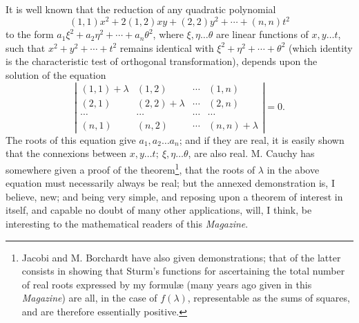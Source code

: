 \documentclass[11pt]{article}
\newcommand{\sourcepage}[1]{\marginpar{\scriptsize p.~#1}}
\begin{document}
{{\sourcepage{378}
It is well known that the reduction of any quadratic polynomial
\[
(1,1)x^2+2(1,2)xy+(2,2)y^2+\cdots+(n,n)t^2
\]
to the form $a_1\xi^2+a_2\eta^2+\cdots+a_n\theta^2$, where $\xi,\eta\ldots\theta$ are linear functions of $x,y\ldots t$, such that $x^2+y^2+\cdots+t^2$ remains identical with $\xi^2+\eta^2+\cdots+\theta^2$ (which identity is the characteristic test of orthogonal transformation), depends upon the solution of the equation
\[
\left|\begin{array}{cccc}
(1,1)+\lambda&(1,2)&\cdots&(1,n)\\
(2,1)&(2,2)+\lambda&\cdots&(2,n)\\
\cdots&\cdots&\cdots&\cdots\\
(n,1)&(n,2)&\cdots&(n,n)+\lambda
\end{array}\right|=0.
\]
The roots of this equation give $a_1,a_2\ldots a_n$; and if they are real, it is easily shown that the connexions between $x,y\ldots t;\ \xi,\eta\ldots\theta$, are also real. M. Cauchy has somewhere given a proof of the theorem\footnote{Jacobi and M. Borchardt have also given demonstrations; that of the latter consists in showing that Sturm's functions for ascertaining the total number of real roots expressed by my formulæ (many years ago given in this \emph{Magazine}) are all, in the case of $f(\lambda)$, representable as the sums of squares, and are therefore essentially positive.}, that the roots of $\lambda$ in the above equation must necessarily always be real; but the annexed demonstration is, I believe, new; and being very simple, and reposing upon a theorem of interest in itself, and capable no doubt of many other applications, will, I think, be interesting to the mathematical readers of this \emph{Magazine}.

}}
\end{document}
